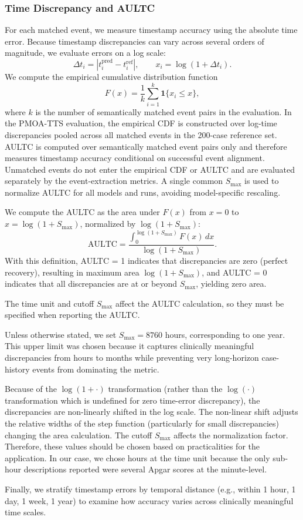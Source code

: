 

\subsubsection{Time Discrepancy and AULTC}
\label{ch05:apd:aultc}\label{ch06:apd:ltcdf}

For each matched event, we measure timestamp accuracy using the absolute time error.
Because timestamp discrepancies can vary across several orders of magnitude, we evaluate errors on a log scale:
\[
\Delta t_i=|t_i^{\mathrm{pred}}-t_i^{\mathrm{ref}}|,
\qquad x_i=\log(1+\Delta t_i).
\]
We compute the empirical cumulative distribution function
\[
F(x)=\frac{1}{k}\sum_{i=1}^{k}\mathbf{1}\{x_i\leq x\},
\]
where $k$ is the number of semantically matched event pairs in the evaluation.
In the PMOA-TTS evaluation, the empirical CDF is constructed over log-time discrepancies pooled across all matched events in the 200-case reference set.
AULTC is computed over semantically matched event pairs only and therefore measures timestamp accuracy conditional on successful event alignment.
Unmatched events do not enter the empirical CDF or AULTC and are evaluated separately by the event-extraction metrics.
A single common $S_{\max}$ is used to normalize AULTC for all models and runs, avoiding model-specific rescaling.

We compute the AULTC as the area under $F(x)$ from $x=0$ to $x=\log(1+S_{\max})$, normalized by $\log(1+S_{\max})$:
\[
\mathrm{AULTC}
=
\frac{\displaystyle\int_0^{\log(1+S_{\max})}F(x)\,dx}
{\log(1+S_{\max})}.
\]
With this definition, AULTC = 1 indicates that discrepancies are zero (perfect recovery), resulting in maximum area $\log(1+S_{\max})$, and AULTC = 0 indicates that all discrepancies are at or beyond $S_{\max}$, yielding zero area.

\begin{ChSixRemark}
The time unit and cutoff $S_\text{max}$ affect the AULTC calculation, so they must be specified when reporting the AULTC.
\end{ChSixRemark}
Unless otherwise stated, we set $S_{\max}=8760$ hours, corresponding to one year.
This upper limit was chosen because it captures clinically meaningful discrepancies from hours to months while preventing very long-horizon case-history events from dominating the metric.

Because of the $\log(1 + \cdot)$ transformation (rather than the $\log(\cdot)$ transformation which is undefined for zero time-error discrepancy), the discrepancies are non-linearly shifted in the log scale.
The non-linear shift adjusts the relative widths of the step function (particularly for small discrepancies) changing the area calculation.
The cutoff $S_\text{max}$ affects the normalization factor.
Therefore, these values should be chosen based on practicalities for the application.
In our case, we chose hours at the time unit because the only sub-hour descriptions reported were several Apgar scores at the minute-level.

Finally, we stratify timestamp errors by temporal distance (e.g., within 1 hour, 1 day, 1 week,
1 year) to examine how accuracy varies across clinically meaningful time scales.
